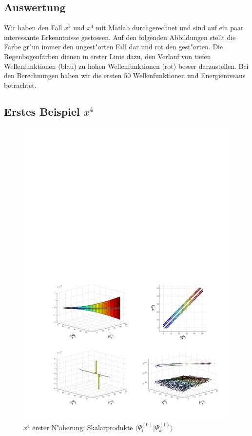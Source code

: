 \begin{refsection}
\section{Auswertung}

Wir haben den Fall $x^3$ und $x^4$ mit Matlab durchgerechnet und sind auf
ein paar interessante Erkenntnisse gestossen.
Auf den folgenden Abbildungen stellt die Farbe gr"un
immer den ungest"orten Fall dar und rot den gest"orten.
Die Regenbogenfarben dienen in erster Linie dazu, den Verlauf von
tiefen Wellenfunktionen (blau) zu hohen Wellenfunktionen (rot) besser darzustellen.
Bei den Berechnungen haben wir die ersten 50 Wellenfunktionen und Energieniveaus
betrachtet.

\subsection{Erstes Beispiel $x^4$}

\begin{figure}	%
\centering
\includegraphics[width=1.0\textwidth]{anharmonisch/images/x4/Stoerung1Skalare.pdf}
\caption{$x^4$ erster N"aherung: Skalarprodukte $\langle\Psi_l^{(0)}|\Psi_k^{(1)}\rangle$
\label{skript:x4_Stoerung1Skalare}}
\end{figure}


\end{refsection}
